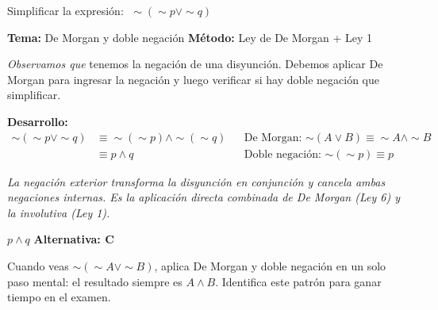 \begin{tcolorbox}[
  enhanced, breakable,
  colback=GrisClaro, colframe=AzulPizarra,
  fonttitle=\bfseries\sffamily,
  title={Ejercicio 1 --- Nivel B\'{a}sico},
  arc=3pt, boxrule=0.8pt
]
\begin{problema}
  Simplificar la expresión: $\;\sim(\sim p \vee \sim q)$
\end{problema}

\smallskip
\noindent
\textbf{\sffamily\color{AzulMedio}Tema:} De Morgan y doble negación
\hfill
\textbf{\sffamily\color{AzulMedio}M\'{e}todo:} Ley de De Morgan + Ley 1

\medskip
\noindent\textit{Observamos que} tenemos la negación de una disyunción.
Debemos aplicar De Morgan para ingresar la negación y luego verificar
si hay doble negación que simplificar.

\medskip
\noindent\textbf{\sffamily Desarrollo:}
\begin{align*}
  \sim(\sim p \vee \sim q)
  &\equiv \sim(\sim p) \wedge \sim(\sim q)
  && \text{De Morgan: $\sim(A \vee B) \equiv \sim A \wedge \sim B$} \\[6pt]
  &\equiv p \wedge q
  && \text{Doble negaci\'{o}n: $\sim(\sim p) \equiv p$}
\end{align*}

\noindent\textit{La negación exterior transforma la disyunción en conjunción
y cancela ambas negaciones internas. Es la aplicación directa combinada
de De Morgan (Ley 6) y la involutiva (Ley 1).}

\medskip
\begin{tcolorbox}[
  colback=AzulClaro!60, colframe=AzulPizarra,
  arc=2pt, boxrule=0.8pt, left=8pt, right=8pt
]
\centering
$\displaystyle \boxed{p \wedge q}$
\quad \textbf{Alternativa: C}
\end{tcolorbox}

\begin{cajatip}
  Cuando veas $\sim(\sim A \vee \sim B)$, aplica De Morgan y doble
  negación en un solo paso mental: el resultado siempre es $A \wedge B$.
  Identifica este patrón para ganar tiempo en el examen.
\end{cajatip}
\end{tcolorbox}
\vspace{0.5cm}

